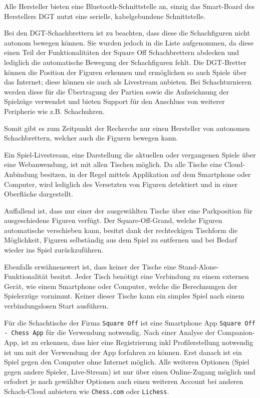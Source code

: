Alle Hersteller bieten eine Bluetooth-Schnittstelle an, einzig das
Smart-Board des Herstellers DGT nutzt eine serielle, kabelgebundene
Schnittstelle.

Bei den DGT-Schachbrettern ist zu beachten, dass diese die Schachfiguren
nicht autonom bewegen können. Sie wurden jedoch in die Liste
aufgenommen, da diese einen Teil der Funktionalitäten der Square Off
Schachbrettern abdecken und lediglich die automatische Bewegung der
Schachfiguren fehlt. Die DGT-Bretter können die Position der Figuren
erkennen und ermöglichen so auch Spiele über das Internet; diese können
sie auch als Livestream anbieten. Bei Schachturnieren werden diese für
die Übertragung der Partien sowie die Aufzeichnung der Spielzüge
verwendet und bieten Support für den Anschluss von weiterer Peripherie
wie z.B. Schachuhren.

Somit gibt es zum Zeitpunkt der Recherche nur einen Hersteller von
autonomen Schachbrettern, welcher auch die Figuren bewegen kann.

Ein Spiel-Livestream, eine Darstellung die aktuellen oder vergangenen
Spiele über eine Webanwendung, ist mit allen Tischen möglich. Da alle
Tische eine Cloud-Anbindung besitzen, in der Regel mittels Applikation
auf dem Smartphone oder Computer, wird lediglich des Versetzten von
Figuren detektiert und in einer Oberfläche dargestellt.

Auffallend ist, dass nur einer der ausgewählten Tische über eine
Parkposition für ausgeschiedene Figuren verfügt. Der Square-Off-Grand,
welche Figuren automatische verschieben kann, besitzt dank der
rechteckigen Tischform die Möglichkeit, Figuren selbständig aus dem
Spiel zu entfernen und bei Bedarf wieder ins Spiel zurückzuführen.

Ebenfalls erwähnenswert ist, dass keiner der Tische eine
Stand-Alone-Funktionalität besitzt. Jeder Tisch benötigt eine Verbindung
zu einem externen Gerät, wie einem Smartphone oder Computer, welche die
Berechnungen der Spielerzüge vornimmt. Keiner dieser Tische kann ein
simples Spiel nach einem verbindungslosen Start ausführen.

Für die Schachtische der Firma \passthrough{\lstinline!Square Off!} ist
eine Smartphone App
\passthrough{\lstinline!Square Off - Chess App!}\cite{squareoffapp}
für die Verwendung notwendig. Nach einer Analyse der Companion-App, ist
zu erkennen, dass hier eine Registrierung inkl Profilerstellung
notwendig ist um mit der Verwendung der App forfahren zu können. Erst
danach ist ein Spiel gegen den Computer ohne Internet möglich. Alle
weiteren Optionen (Spiel gegen andere Spieler, Live-Stream) ist nur über
einen Online-Zugang möglich und erfodert je nach gewählter Optionen auch
einen weiteren Account bei anderen Schach-Cloud anbietern wie
\passthrough{\lstinline!Chess.com!} oder
\passthrough{\lstinline!Lichess!}.

